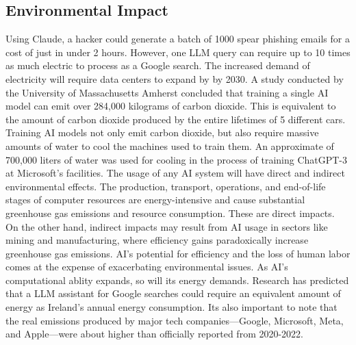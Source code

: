 \documentclass[10pt,twocolumn]{article}
\begin{document}
\subsection{Environmental Impact}
Using Claude, a hacker could generate a batch of 1000 spear phishing emails for a cost of just  in under 2 hours. However, one LLM query can require up to 10 times as much electric to process as a Google search. The increased demand of electricity will require data centers to expand by  by 2030. A study conducted by the University of Massachusetts Amherst concluded that training a single AI model can emit over 284,000 kilograms of carbon dioxide. This is equivalent to the amount of carbon dioxide produced by the entire lifetimes of 5 different cars. Training AI models not only emit carbon dioxide, but also require massive amounts of water to cool the machines used to train them. An approximate of 700,000 liters of water was used for cooling in the process of training ChatGPT-3 at Microsoft’s facilities. 
The usage of any AI system will have direct and indirect environmental effects. The production, transport, operations, and end-of-life stages of computer resources are energy-intensive and cause substantial greenhouse gas emissions and resource consumption. These are direct impacts. On the other hand, indirect impacts may result from AI usage in sectors like mining and manufacturing, where efficiency gains paradoxically increase greenhouse gas emissions. AI’s potential for efficiency and the loss of human labor comes at the expense of exacerbating environmental issues. As AI’s computational ablity expands, so will its energy demands. Research has predicted that a LLM assistant for Google searches could require an equivalent amount of energy as Ireland’s annual energy consumption. Its also important to note that the real emissions produced by major tech companies—Google, Microsoft, Meta, and Apple—were about  higher than officially reported from 2020-2022.\cite{ai_colonialism}
\end{document}
